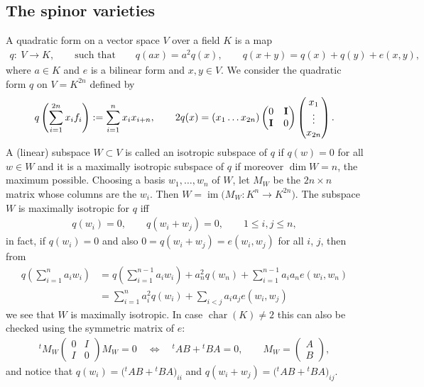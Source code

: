 \documentclass[10pt,a4paper]{amsart}
\numberwithin{equation}{section}
\begin{document}
\subsection{The spinor varieties}\label{isotr}\label{pfmap}
A quadratic form on a vector space $V$ over a field $K$ is a map
\begin{gather*}
q\colon \ V \longrightarrow K,\qquad \text{such that}\qquad q(ax) = a^2q(x),\qquad q(x+y) = q(x) + q(y) +e(x,y),
\end{gather*}
where $a\in K$ and $e$ is a bilinear form and $x,y\in V$. We consider the quadratic form $q$ on $V=K^{2n}$ defined by
\begin{gather*}
q\left(\sum_{i=1}^{2n}x_if_i\right) := \sum_{i=1}^nx_ix_{i+n},\qquad 2q(x) = (x_1\ldots x_{2n})
\begin{pmatrix}
 0&{\bf I}\\{\bf I}&0
 \end{pmatrix}\begin{pmatrix}
 x_1\\ \vdots\\x_{2n}
 \end{pmatrix}.
\end{gather*}
A (linear) subspace $W\subset V$ is called an isotropic subspace of $q$ if $q(w)=0$ for all $w\in W$ and it is a maximally isotropic subspace of $q$ if moreover $\dim W=n$, the maximum possible. Choosing a basis $w_1,\ldots, w_n$ of $W$, let $M_W$ be the $2n\times n$ matrix whose columns are the $w_i$. Then $W=\operatorname{im}\big(M_W\colon K^n\rightarrow K^{2n}\big)$. The subspace $W$ is maximally isotropic for $q$ iff
\begin{gather*}
q(w_i) = 0,\qquad q(w_i+w_j) = 0,\qquad 1\le i,j\leq n,
\end{gather*}
in fact, if $q(w_i)=0$ and also $0=q(w_i+w_j)=e(w_i,w_j)$ for all $i$, $j$, then from
\begin{align*}
q\left(\sum_{i=1}^{n}a_iw_i\right) & = q\left(\sum_{i=1}^{n-1}a_iw_i\right)+a_n^2q(w_{n})+\sum_{i=1}^{n-1}a_ia_{n}e(w_i,w_{n}) \\
& = \sum_{i=1}^na_i^2q(w_i) + \sum_{i<j} a_ia_je(w_i,w_j)
\end{align*}
we see that $W$ is maximally isotropic. In case $\operatorname{char}(K)\ne 2$ this can also be checked using the symmetric matrix of $e$:
\begin{gather*}
{}^tM_W\begin{pmatrix}
 0&I\\I&0
 \end{pmatrix} M_W = 0\quad\Longleftrightarrow\quad
 {}^tAB + {}^tBA = 0,\qquad M_W = \begin{pmatrix} A\\B\end{pmatrix},
\end{gather*}
and notice that $q(w_i)=\big({}^tAB + {}^tBA\big)_{ii}$ and $q(w_i +w_j)=\big({}^tAB + {}^tBA\big)_{ij}$.
\end{document}
